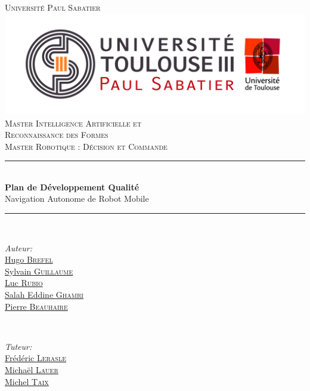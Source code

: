 \documentclass[10pt,a4paper]{article}
\begin{document}
\pagestyle {plain}

\begin{titlepage}


\newcommand{\HRule}{\rule{\linewidth}{0.5mm}} 

\center

\textsc{\Large Université Paul Sabatier}\\[1cm] 
\includegraphics[scale=0.3]{UPS.jpg}\\[0.6cm] 


\textsc{Master Intelligence Artificielle et \\ 
Reconnaissance des Formes \\ Master Robotique : Décision et Commande}\\[3cm] 

\HRule \\[0.4cm]
{ \huge \bfseries Plan de Développement Qualité}\\[0.4cm] 
\LARGE Navigation Autonome de Robot Mobile

\HRule \\[1.5cm]
 

\begin{minipage}{0.4\textwidth}
\begin{flushleft} \large
\emph{Auteur:}\\
\href{mailto:brefel.hugo@gmail.com}{Hugo \textsc{Brefel} }  \\
\href{mailto:sylvain31g@free.fr}{Sylvain \textsc{Guillaume} } \\
\href{mailto:luc.rubio.lr@gmail.com}{Luc \textsc{Rubio} } \\
\href{mailto:salaheddineghamri@gmail.com}{Salah Eddine \textsc{Ghamri} } \\
\href{mailto:beauhaire.pierre@gmail.com}{Pierre \textsc{Beauhaire} }  
\end{flushleft}
\end{minipage}
~
\begin{minipage}{0.4\textwidth}
\begin{flushright} \large
\emph{Tuteur:} \\
\href{mailto:lerasle@laas.fr}{Frédéric \textsc{Lerasle}}\\
\href{mailto:michael.lauer@laas.fr}{Michaël \textsc{Lauer}} \\
\href{mailto:taix@laas.f}{Michel \textsc{Taix}}
\end{flushright}
\end{minipage}\\[5cm]


\end{titlepage}
\end{document}
